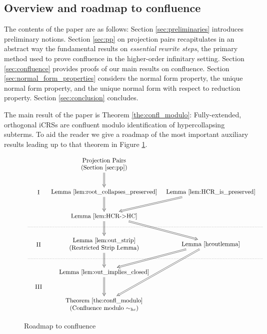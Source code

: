 \documentclass{LMCS}
\theoremstyle{plain}
\theoremstyle{definition}
\newcommand{\simhc}{\sim_{hc}}
\begin{document}
\subsection{Overview and roadmap to confluence}

The contents of the paper are as follows: Section \ref{sec:preliminaries} introduces preliminary notions. Section \ref{sec:pp} on projection pairs recapitulates in an abstract way the fundamental results on \emph{essential rewrite steps}, the primary method used to prove confluence in the higher-order infinitary setting. Section \ref{sec:confluence} provides
proofs of our main results on confluence.
Section \ref{sec:normal_form_properties} considers
the normal form property, the unique normal form property, and the
unique normal form with respect to reduction property. 
Section \ref{sec:conclusion} concludes.



The main result of the paper is Theorem \ref{the:confl_modulo}:
Fully-extended, orthogonal iCRSs are confluent modulo identification of hypercollapsing subterms. To aid the reader we give a roadmap of the most important auxiliary results leading up to that theorem in Figure \ref{fig:road}.


\begin{figure}
\[
\xymatrix@=0.3cm{
  & &  \txt{Projection Pairs\\ (Section  \ref{sec:pp})} \ar@{=>}[dd] &  \\
\\
 & \txt{I} & \txt{Lemma \ref{lem:root_collapses_preserved}} \ar@{=>}[dd] & \txt{Lemma \ref{lem:HCR_is_preserved} } \ar@{=>}[ldd] & \\
\\
 & & \txt{Lemma  \ref{lem:HCR->HC}} \ar@{=>}[dd] \ar@{=>}[ddr] & \\
 \ar@{.}[rrrr] & & & &  \\
 & \txt{II} & \txt{Lemma  \ref{lem:out_strip}\\ (Restricted Strip Lemma)} \ar@{=>}[dd] & \txt{Lemma \ref{hcoutlemma}} \ar@{=>}[ddddl] \ar@{=>}[ddl] && \\
 \ar@{.}[rrrr] & & & & \\
 & & \txt{Lemma \ref{lem:out_implies_closed}} \ar@{=>}[dd] &   \\
 & \txt{III} \\
 & & \txt{Theorem  \ref{the:confl_modulo}\\(Confluence modulo $\simhc$)} & 
}
\]
\caption{\label{fig:road}Roadmap to confluence}
\end{figure}
\end{document}

